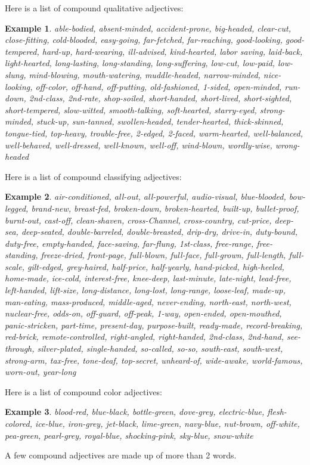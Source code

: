 \documentclass[oneside]{book}
\numberwithin{equation}{section}
\newtheorem{example}{Example}[section]
\begin{document}
%
\noindent{} Here is a list of compound qualitative adjectives:
\begin{example}
    able-bodied, absent-minded, accident-prone, big-headed, clear-cut, close-fitting, cold-blooded, easy-going, far-fetched, far-reaching, good-looking, good-tempered, hard-up, hard-wearing, ill-advised, kind-hearted, labor saving, laid-back, light-hearted, long-lasting, long-standing, long-suffering, low-cut, low-paid, low-slung, mind-blowing, mouth-watering, muddle-headed, narrow-minded, nice-looking, off-color, off-hand, off-putting, old-fashioned, 1-sided, open-minded, run-down, 2nd-class, 2nd-rate, shop-soiled, short-handed, short-lived, short-sighted, short-tempered, slow-witted, smooth-talking, soft-hearted, starry-eyed, strong-minded, stuck-up, sun-tanned, swollen-headed, tender-hearted, thick-skinned, tongue-tied, top-heavy, trouble-free, 2-edged, 2-faced, warm-hearted, well-balanced, well-behaved, well-dressed, well-known, well-off, wind-blown, wordly-wise, wrong-headed
\end{example}
%
\noindent{} Here is a list of compound classifying adjectives:
\begin{example}
    air-conditioned, all-out, all-powerful, audio-visual, blue-blooded, bow-legged, brand-new, breast-fed, broken-down, broken-hearted, built-up, bullet-proof, burnt-out, cast-off, clean-shaven, cross-Channel, cross-country, cut-price, deep-sea, deep-seated, double-barreled, double-breasted, drip-dry, drive-in, duty-bound, duty-free, empty-handed, face-saving, far-flung, 1st-class, free-range, free-standing, freeze-dried, front-page, full-blown, full-face, full-grown, full-length, full-scale, gilt-edged, grey-haired, half-price, half-yearly, hand-picked, high-heeled, home-made, ice-cold, interest-free, knee-deep, last-minute, late-night, lead-free, left-handed, lift-size, long-distance, long-lost, long-range, loose-leaf, made-up, man-eating, mass-produced, middle-aged, never-ending, north-east, north-west, nuclear-free, odds-on, off-guard, off-peak, 1-way, open-ended, open-mouthed, panic-stricken, part-time, present-day, purpose-built, ready-made, record-breaking, red-brick, remote-controlled, right-angled, right-handed, 2nd-class, 2nd-hand, see-through, silver-plated, single-handed, so-called, so-so, south-east, south-west, strong-arm, tax-free, tone-deaf, top-secret, unheard-of, wide-awake, world-famous, worn-out, year-long
\end{example}
%
\noindent{} Here is a list of compound color adjectives:
\begin{example}
    blood-red, blue-black, bottle-green, dove-grey, electric-blue, flesh-colored, ice-blue, iron-grey, jet-black, lime-green, navy-blue, nut-brown, off-white, pea-green, pearl-grey, royal-blue, shocking-pink, sky-blue, snow-white
\end{example}
%
\noindent{} A few compound adjectives are made up of more than 2 words.
\end{document}
